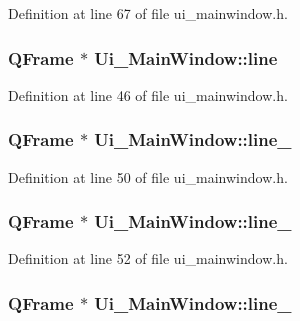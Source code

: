 Definition at line 67 of file ui\+\_\+mainwindow.\+h.

\subsubsection[{\texorpdfstring{line}{line}}]{\setlength{\rightskip}{0pt plus 5cm}Q\+Frame $\ast$ Ui\+\_\+\+Main\+Window\+::line}\hypertarget{class_ui___main_window_a249d59b1188cc69f7e0290da15019085}{}\label{class_ui___main_window_a249d59b1188cc69f7e0290da15019085}


Definition at line 46 of file ui\+\_\+mainwindow.\+h.

\subsubsection[{\texorpdfstring{line\+\_\+2}{line_2}}]{\setlength{\rightskip}{0pt plus 5cm}Q\+Frame $\ast$ Ui\+\_\+\+Main\+Window\+::line\+\_}\hypertarget{class_ui___main_window_a05cd891c7a6c198155d7559787d29485}{}\label{class_ui___main_window_a05cd891c7a6c198155d7559787d29485}


Definition at line 50 of file ui\+\_\+mainwindow.\+h.

\subsubsection[{\texorpdfstring{line\+\_\+3}{line_3}}]{\setlength{\rightskip}{0pt plus 5cm}Q\+Frame $\ast$ Ui\+\_\+\+Main\+Window\+::line\+\_}\hypertarget{class_ui___main_window_a3ef6876a5881954fc438e25a56f2b0d4}{}\label{class_ui___main_window_a3ef6876a5881954fc438e25a56f2b0d4}


Definition at line 52 of file ui\+\_\+mainwindow.\+h.

\subsubsection[{\texorpdfstring{line\+\_\+5}{line_5}}]{\setlength{\rightskip}{0pt plus 5cm}Q\+Frame $\ast$ Ui\+\_\+\+Main\+Window\+::line\+\_}\hypertarget{class_ui___main_window_a2cdc8e583c152028a110fd6d79ba1298}{}\label{class_ui___main_window_a2cdc8e583c152028a110fd6d79ba1298}


